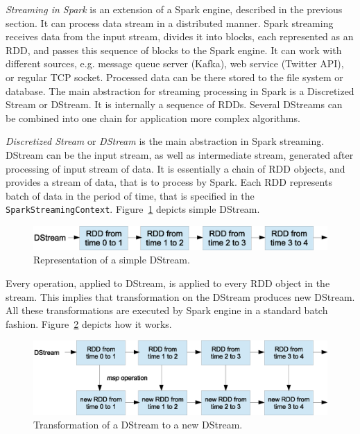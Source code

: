 
\textit{Streaming in Spark}  is an extension of a Spark engine, described in the previous section.
It can process data stream in a distributed manner.
Spark streaming receives data from the input stream, divides it into blocks, each represented as an RDD, and passes this sequence of blocks to the Spark engine.
It can work with different sources, e.g. message queue server (Kafka), web service (Twitter API), or regular TCP socket.
Processed data can be there stored to the file system or database.
The main abstraction for streaming processing in Spark is a Discretized Stream or DStream.
It is internally a sequence of RDDs.
Several DStreams can be combined into one chain for application more complex algorithms. 

\textit{Discretized Stream} or \textit{DStream}  is the main abstraction in Spark streaming.
DStream can be the input stream, as well as intermediate stream, generated after processing of input stream of data.
It is essentially a chain of RDD objects, and provides a stream of data, that is to process by Spark.
Each RDD represents batch of data in the period of time, that is specified in the \lstinline{SparkStreamingContext}.
Figure~\ref{fig:SimpleDStream} depicts simple DStream.

\begin{figure}[h]
  \centering
  \includegraphics [width=1.0\textwidth]{images/SimpleDStream}
  \caption{Representation of a simple DStream.}
  \label{fig:SimpleDStream}
\end{figure}

Every operation, applied to DStream, is applied to every RDD object in the stream.
This implies that transformation on the DStream produces new DStream.
All these transformations are executed by Spark engine in a standard batch fashion.
Figure~\ref{fig:DStreamWithTransformation} depicts how it works.

\begin{figure}[h]
  \centering
  \includegraphics [width=1.0\textwidth]{images/DStreamWithTransformation}
  \caption{Transformation of a DStream to a new DStream.}
  \label{fig:DStreamWithTransformation}
\end{figure}


